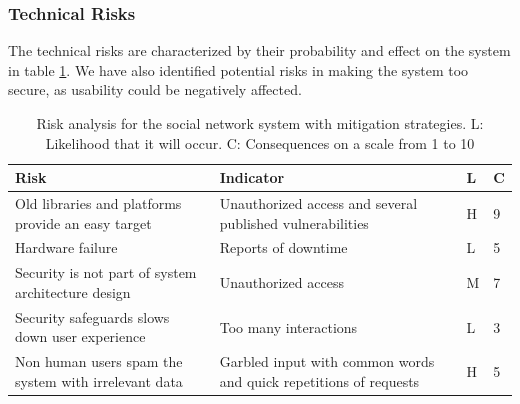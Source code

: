 \documentclass[a4paper]{article}
\begin{document}
\subsubsection{Technical Risks}
The technical risks are characterized by their probability and effect on the system in table \ref{tab:risk_analysis}. We have also identified potential risks in making the system too secure, as usability could be negatively affected.

\begin{table}[h!]
	\begin{tabular}{| p{5cm} | p{5cm} | l | l |}
		\hline
		\textbf{Risk} & \textbf{Indicator} & \textbf{L} & \textbf{C}  \\ \hline
        Old libraries and platforms provide an easy target & Unauthorized access and several published vulnerabilities & H & 9 \\\hline
        Hardware failure & Reports of downtime & L & 5 \\ \hline
        Security is not part of system architecture design & Unauthorized access & M & 7 \\ \hline
		Security safeguards slows down user experience & Too many interactions & L & 3
		\\ \hline
		Non human users spam the system with irrelevant data & Garbled input with common words and quick repetitions of requests & H & 5
				\\ \hline
	\end{tabular}
	\caption{Risk analysis for the social network system with mitigation strategies. L: Likelihood that it will occur. C: Consequences on a scale from 1 to 10}
	\label{tab:risk_analysis}
	

\end{table}
\end{document}
